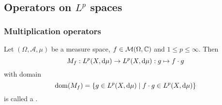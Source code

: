 \subsection{Operators on $L^p$ spaces}
\subsubsection{Multiplication operators}
\begin{definition}
Let $(\Omega, \mathcal{A}, \mu)$ be a measure space, $f\in \operatorname{\mathcal{M}}(\Omega, \mathbb{C})$ and $1\leq p \leq \infty$. Then
\[ M_f: L^p(X, \operatorname{d \!}{\mu}) \to L^p(X, \operatorname{d \!}{\mu}): g\mapsto f\cdot g \]
with domain
\[ \dom(M_f) = \setbuilder{g\in L^p(X, \diff{\mu})}{f\cdot g \in L^p(X, \diff{\mu})} \]
is called a .
\end{definition}

